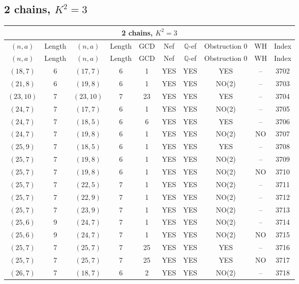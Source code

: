 \subsection{2 chains, $K^2 = 3$}
\begin{longtable}{|c|c|c|c|c|c|c|c|c|c|}
\hline
\multicolumn{10}{|c|}{2 chains, $K^2 = 3$}\\
\hline
$(n,a)$ & Length & $(n,a)$ & Length & GCD & Nef & $\mathbb Q$-ef & Obstruction 0 & WH & Index\\
\hline
\endfirsthead

\hline
$(n,a)$ & Length & $(n,a)$ & Length & GCD & Nef & $\mathbb Q$-ef & Obstruction 0 & WH & Index\\
\hline
\endhead
\hline
\endfoot

$(18, 7)$ & 6 & $(17, 7)$ & 6 & 1 & YES & YES & YES & -- & 3702\\
$(21, 8)$ & 6 & $(19, 8)$ & 6 & 1 & YES & YES & NO(2) & -- & 3703\\
$(23, 10)$ & 7 & $(23, 10)$ & 7 & 23 & YES & YES & YES & -- & 3704\\
$(24, 7)$ & 7 & $(17, 7)$ & 6 & 1 & YES & YES & NO(2) & -- & 3705\\
$(24, 7)$ & 7 & $(18, 5)$ & 6 & 6 & YES & YES & YES & -- & 3706\\
$(24, 7)$ & 7 & $(19, 8)$ & 6 & 1 & YES & YES & NO(2) & NO & 3707\\
$(25, 9)$ & 7 & $(18, 5)$ & 6 & 1 & YES & YES & YES & -- & 3708\\
$(25, 7)$ & 7 & $(19, 8)$ & 6 & 1 & YES & YES & NO(2) & -- & 3709\\
$(25, 7)$ & 7 & $(19, 8)$ & 6 & 1 & YES & YES & NO(2) & NO & 3710\\
$(25, 7)$ & 7 & $(22, 5)$ & 7 & 1 & YES & YES & NO(2) & -- & 3711\\
$(25, 7)$ & 7 & $(22, 9)$ & 7 & 1 & YES & YES & NO(2) & -- & 3712\\
$(25, 7)$ & 7 & $(23, 9)$ & 7 & 1 & YES & YES & NO(2) & -- & 3713\\
$(25, 6)$ & 9 & $(24, 7)$ & 7 & 1 & YES & YES & NO(2) & -- & 3714\\
$(25, 6)$ & 9 & $(24, 7)$ & 7 & 1 & YES & YES & NO(2) & NO & 3715\\
$(25, 7)$ & 7 & $(25, 7)$ & 7 & 25 & YES & YES & YES & -- & 3716\\
$(25, 7)$ & 7 & $(25, 7)$ & 7 & 25 & YES & YES & YES & NO & 3717\\
$(26, 7)$ & 7 & $(18, 7)$ & 6 & 2 & YES & YES & NO(2) & -- & 3718\\

\end{longtable}
